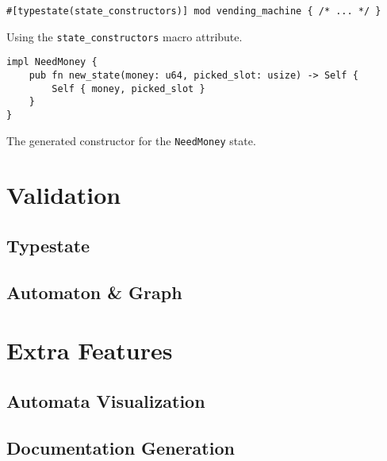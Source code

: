 \begin{listing}
    \begin{verbatim}
#[typestate(state_constructors)] mod vending_machine { /* ... */ }
    \end{verbatim}
    \caption{Using the \texttt{state\_constructors} macro attribute.}
    \label{lst:vending-machine-advanced-constructors}
\end{listing}


\begin{listing}
    \begin{verbatim}
impl NeedMoney {
    pub fn new_state(money: u64, picked_slot: usize) -> Self {
        Self { money, picked_slot }
    }
}
    \end{verbatim}
    \caption{The generated constructor for the \texttt{NeedMoney} state.}
    \label{lst:vending-machine-advanced-constructors-expansion}
\end{listing}



\section{Validation}\label{sec:validation}

\subsection{Typestate}\label{sec:validation:typestate}

\subsection{Automaton \& Graph}\label{sec:validation:automaton}

\section{Extra Features}\label{sec:extra-features}

\subsection{Automata Visualization}\label{sec:extra-features:automata-visualization}

\subsection{Documentation Generation}\label{sec:extra-features:documentation-generation}
